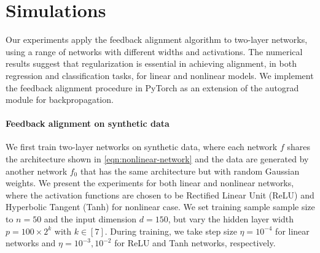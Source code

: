 \section{Simulations}

Our experiments apply the feedback alignment algorithm to two-layer networks, using a range of networks with different widths and activations. The numerical results suggest that regularization is essential in achieving alignment, in both regression and classification tasks, for linear and nonlinear models. We implement the feedback alignment procedure in PyTorch as an extension of the autograd module for backpropagation.

\paragraph{Feedback alignment on synthetic data}

We first train two-layer networks on synthetic data, where each network $f$ shares the architecture shown in \eqref{eqn:nonlinear-network} and the data are generated by another network $f_0$ that has the same architecture but with random Gaussian weights. We present the experiments for both linear and nonlinear networks, where the activation functions are chosen to be Rectified Linear Unit (ReLU) and Hyperbolic Tangent (Tanh) for nonlinear case. We set training sample sample size to $n=50$ and the input dimension $d=150$, but vary the hidden layer width $p = 100\times 2^k$ with $k\in[7]$. During training, we take step size $\eta = 10^{-4}$ for linear networks and $\eta = 10^{-3},10^{-2}$ for ReLU and Tanh networks, respectively.


